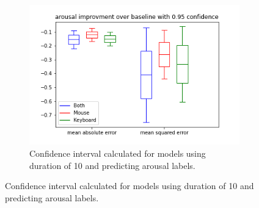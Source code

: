 \begin{figure}[!h]
\begin{subfigure}[b]{0.31\textwidth}
        \centering
        \includegraphics[width=\textwidth]{figures/results/interval_difference/10/10_arousal_0.95.png}
        \captionsetup{justification=centering}
        \caption{Confidence interval calculated for models using duration of 10 and predicting arousal labels.}
    \end{subfigure}



\end{figure}
